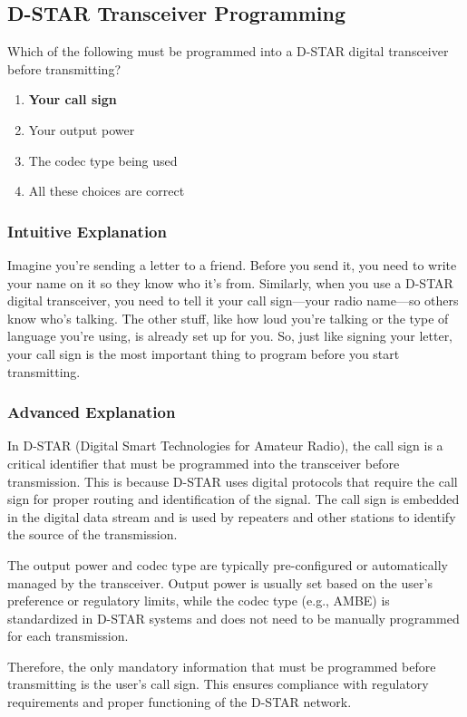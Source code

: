 \subsection{D-STAR Transceiver Programming}\label{T4B11}

\begin{tcolorbox}[colback=gray!10!white,colframe=black!75!black,title=T4B11]
Which of the following must be programmed into a D-STAR digital transceiver before transmitting?
\begin{enumerate}[label=\Alph*.]
    \item \textbf{Your call sign}
    \item Your output power
    \item The codec type being used
    \item All these choices are correct
\end{enumerate}
\end{tcolorbox}

\subsubsection{Intuitive Explanation}
Imagine you're sending a letter to a friend. Before you send it, you need to write your name on it so they know who it's from. Similarly, when you use a D-STAR digital transceiver, you need to tell it your call sign—your radio name—so others know who's talking. The other stuff, like how loud you're talking or the type of language you're using, is already set up for you. So, just like signing your letter, your call sign is the most important thing to program before you start transmitting.

\subsubsection{Advanced Explanation}
In D-STAR (Digital Smart Technologies for Amateur Radio), the call sign is a critical identifier that must be programmed into the transceiver before transmission. This is because D-STAR uses digital protocols that require the call sign for proper routing and identification of the signal. The call sign is embedded in the digital data stream and is used by repeaters and other stations to identify the source of the transmission.

The output power and codec type are typically pre-configured or automatically managed by the transceiver. Output power is usually set based on the user's preference or regulatory limits, while the codec type (e.g., AMBE) is standardized in D-STAR systems and does not need to be manually programmed for each transmission.

Therefore, the only mandatory information that must be programmed before transmitting is the user's call sign. This ensures compliance with regulatory requirements and proper functioning of the D-STAR network.

